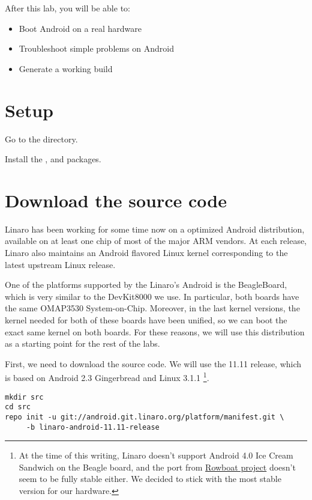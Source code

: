 
After this lab, you will be able to:
\begin{itemize}
  \item Boot Android on a real hardware
  \item Troubleshoot simple problems on Android
  \item Generate a working build
\end{itemize}

\section{Setup}

Go to the  directory.

Install the ,  and
 packages.

\section{Download the source code}

Linaro has been working for some time now on a optimized Android
distribution, available on at least one chip of most of the major ARM
vendors. At each release, Linaro also maintains an Android flavored
Linux kernel corresponding to the latest upstream Linux release.

One of the platforms supported by the Linaro's Android is the
BeagleBoard, which is very similar to the DevKit8000 we use. In
particular, both boards have the same OMAP3530 System-on-Chip.
Moreover, in the last kernel versions, the kernel needed for both of
these boards have been unified, so we can boot the exact same kernel
on both boards. For these reasons, we will use this distribution as a
starting point for the rest of the labs.

First, we need to download the source code. We will use the 11.11
release, which is based on Android 2.3 Gingerbread and Linux 3.1.1
\footnote{At the time of this writing, Linaro doesn't support Android
  4.0 Ice Cream Sandwich on the Beagle board, and the port from
  \href{http://code.google.com/p/rowboat} {Rowboat project} doesn't
  seem to be fully stable either. We decided to stick with the most
  stable version for our hardware.}.

\begin{verbatim}
mkdir src
cd src
repo init -u git://android.git.linaro.org/platform/manifest.git \
     -b linaro-android-11.11-release
\end{verbatim}

